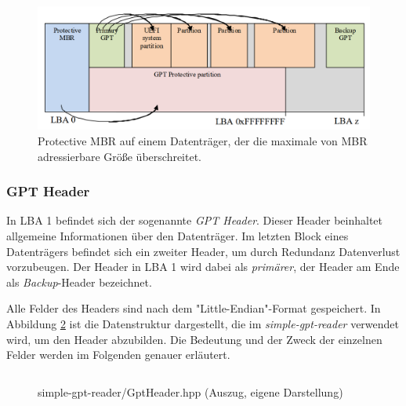 \begin{figure}[ht!]
    \includegraphics[width=\textwidth]{content/graphics/GPT_Layout_with_protective_MBR_large_disk.png}
    
    \vspace{-0.2cm}

    \caption{Protective MBR auf einem Datenträger, der die maximale von MBR adressierbare Größe überschreitet.\cite{uefi-spec}}
    \label{fig:protective-mbr-large-disk}
\end{figure}


\newpage
\subsubsection{GPT Header}
In LBA 1 befindet sich der sogenannte \textit{GPT Header}.
Dieser Header beinhaltet allgemeine Informationen über den Datenträger.
Im letzten Block eines Datenträgers befindet sich ein zweiter Header, um durch Redundanz Datenverlust vorzubeugen.
Der Header in LBA 1 wird dabei als \textit{primärer}, der Header am Ende als \textit{Backup}-Header bezeichnet.

Alle Felder des Headers sind nach dem "Little-Endian"-Format gespeichert.
In Abbildung \ref{fig:GptHeader.hpp} ist die Datenstruktur dargestellt, die im \textit{simple-gpt-reader} verwendet wird, um den Header abzubilden.
Die Bedeutung und der Zweck der einzelnen Felder werden im Folgenden genauer erläutert.

\begin{figure}[ht]
    \inputminted[baselinestretch=1.2, tabsize=4, breaklines, frame=single]{c++}{content/code/simple-gpt-reader/GptHeader.hpp}
    
    \vspace{-0.5cm}

    \caption{simple-gpt-reader/GptHeader.hpp (Auszug, eigene Darstellung)}
    \label{fig:GptHeader.hpp}
\end{figure}

